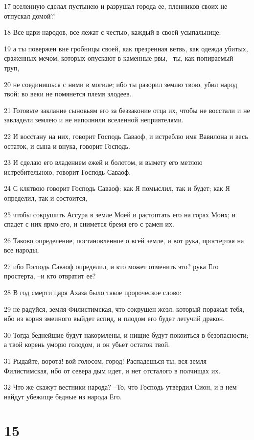 \par 17 вселенную сделал пустынею и разрушал города ее, пленников своих не отпускал домой?'
\par 18 Все цари народов, все лежат с честью, каждый в своей усыпальнице;
\par 19 а ты повержен вне гробницы своей, как презренная ветвь, как одежда убитых, сраженных мечом, которых опускают в каменные рвы, --ты, как попираемый труп,
\par 20 не соединишься с ними в могиле; ибо ты разорил землю твою, убил народ твой: во веки не помянется племя злодеев.
\par 21 Готовьте заклание сыновьям его за беззаконие отца их, чтобы не восстали и не завладели землею и не наполнили вселенной неприятелями.
\par 22 И восстану на них, говорит Господь Саваоф, и истреблю имя Вавилона и весь остаток, и сына и внука, говорит Господь.
\par 23 И сделаю его владением ежей и болотом, и вымету его метлою истребительною, говорит Господь Саваоф.
\par 24 С клятвою говорит Господь Саваоф: как Я помыслил, так и будет; как Я определил, так и состоится,
\par 25 чтобы сокрушить Ассура в земле Моей и растоптать его на горах Моих; и спадет с них ярмо его, и снимется бремя его с рамен их.
\par 26 Таково определение, постановленное о всей земле, и вот рука, простертая на все народы,
\par 27 ибо Господь Саваоф определил, и кто может отменить это? рука Его простерта, --и кто отвратит ее?
\par 28 В год смерти царя Ахаза было такое пророческое слово:
\par 29 не радуйся, земля Филистимская, что сокрушен жезл, который поражал тебя, ибо из корня змеиного выйдет аспид, и плодом его будет летучий дракон.
\par 30 Тогда беднейшие будут накормлены, и нищие будут покоиться в безопасности; а твой корень уморю голодом, и он убьет остаток твой.
\par 31 Рыдайте, ворота! вой голосом, город! Распадешься ты, вся земля Филистимская, ибо от севера дым идет, и нет отсталого в полчищах их.
\par 32 Что же скажут вестники народа? --То, что Господь утвердил Сион, и в нем найдут убежище бедные из народа Его.

\chapter{15}

